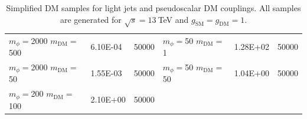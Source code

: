 \begin{table}[]
\begin{tabular}{lll||lll}
$m_\phi=$2000 $m_\textrm{DM}=$500   & 6.10E-04     & 50000                  &  $m_\phi=$50 $m_\textrm{DM}=$1       & 1.28E+02     & 50000                  \\ 
$m_\phi=$2000 $m_\textrm{DM}=$50    & 1.55E-03     & 50000                  &  $m_\phi=$50 $m_\textrm{DM}=$50      & 1.04E+00     & 50000                  \\
$m_\phi=$200 $m_\textrm{DM}=$100    & 2.10E+00     & 50000                  & \\\hline
\end{tabular}
\caption{Simplified DM samples for light jets and pseudoscalar DM couplings. All samples are generated for $\sqrt{s}=13~$TeV and $g_\textrm{SM}=g_\textrm{DM}=1$.}
\label{tab:samples_ps}
\end{table}




